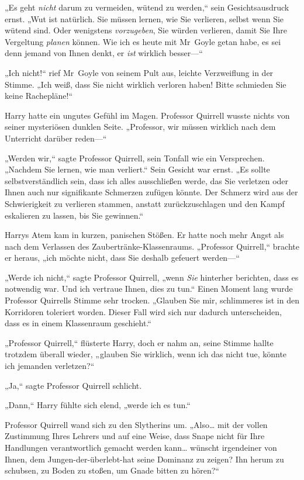 {„Es geht \emph{nicht} darum zu vermeiden, wütend zu werden,“ sein Gesichtsausdruck ernst. „Wut ist natürlich. Sie müssen lernen, wie Sie verlieren, selbst wenn Sie wütend sind. Oder wenigstens \emph{vorzugeben}, Sie würden verlieren, damit Sie Ihre Vergeltung \emph{planen} können. Wie ich es heute mit Mr~Goyle getan habe, es sei denn jemand von Ihnen denkt, er \emph{ist} wirklich besser—“

„Ich nicht!“ rief Mr~Goyle von seinem Pult aus, leichte Verzweiflung in der Stimme. „Ich weiß, dass Sie nicht wirklich verloren haben! Bitte schmieden Sie keine Rachepläne!“

Harry hatte ein ungutes Gefühl im Magen. Professor Quirrell wusste nichts von seiner mysteriösen dunklen Seite. „Professor, wir müssen wirklich nach dem Unterricht darüber reden—“

„Werden wir,“ sagte Professor Quirrell, sein Tonfall wie ein Versprechen. „Nachdem Sie lernen, wie man verliert.“ Sein Gesicht war ernst. „Es sollte selbstverständlich sein, dass ich alles ausschließen werde, das Sie verletzen oder Ihnen auch nur signifikante Schmerzen zufügen könnte. Der Schmerz wird aus der Schwierigkeit zu verlieren stammen, anstatt zurückzuschlagen und den Kampf eskalieren zu lassen, bis Sie gewinnen.“

Harrys Atem kam in kurzen, panischen Stößen. Er hatte noch mehr Angst als nach dem Verlassen des Zaubertränke-Klassenraums. „Professor Quirrell,“ brachte er heraus, „ich möchte nicht, dass Sie deshalb gefeuert werden—“

„Werde ich nicht,“ sagte Professor Quirrell, „wenn \emph{Sie} hinterher berichten, dass es notwendig war. Und ich vertraue Ihnen, dies zu tun.“ Einen Moment lang wurde Professor Quirrells Stimme sehr trocken. „Glauben Sie mir, schlimmeres ist in den Korridoren toleriert worden. Dieser Fall wird sich nur dadurch unterscheiden, dass es in einem Klassenraum geschieht.“

„Professor Quirrell,“ flüsterte Harry, doch er nahm an, seine Stimme hallte trotzdem überall wieder, „glauben Sie wirklich, wenn ich das nicht tue, könnte ich jemanden verletzen?“

„Ja,“ sagte Professor Quirrell schlicht.

„Dann,“ Harry fühlte sich elend, „werde ich es tun.“

Professor Quirrell wand sich zu den Slytherins um. „Also… mit der vollen Zustimmung Ihres Lehrers und auf eine Weise, dass Snape nicht für Ihre Handlungen verantwortlich gemacht werden kann… wünscht irgendeiner von Ihnen, dem Jungen-der-überlebt-hat seine Dominanz zu zeigen? Ihn herum zu schubsen, zu Boden zu stoßen, um Gnade bitten zu hören?“

}
